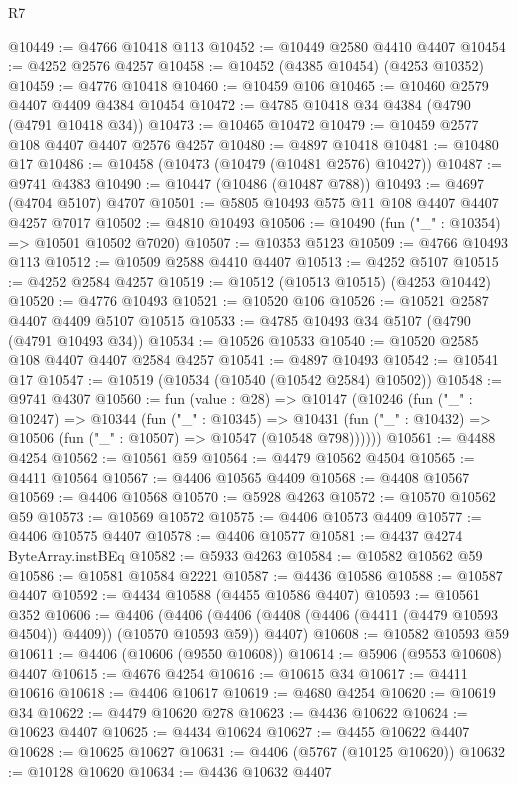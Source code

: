 \begin{lexlean}{R7}
\begin{coremodule}
@10449 := @4766 @10418 @113
@10452 := @10449 @2580 @4410 @4407
@10454 := @4252 @2576 @4257
@10458 := @10452 (@4385 @10454) (@4253 @10352)
@10459 := @4776 @10418
@10460 := @10459 @106
@10465 := @10460 @2579 @4407 @4409 @4384 @10454
@10472 := @4785 @10418 @34 @4384 (@4790 (@4791 @10418 @34))
@10473 := @10465 @10472
@10479 := @10459 @2577 @108 @4407 @4407 @2576 @4257
@10480 := @4897 @10418
@10481 := @10480 @17
@10486 := @10458 (@10473 (@10479 (@10481 @2576) @10427))
@10487 := @9741 @4383
@10490 := @10447 (@10486 (@10487 @788))
@10493 := @4697 (@4704 @5107) @4707
@10501 := @5805 @10493 @575 @11 @108 @4407 @4407 @4257 @7017
@10502 := @4810 @10493
@10506 := @10490 (fun ("_" : @10354) => @10501 @10502 @7020)
@10507 := @10353 @5123
@10509 := @4766 @10493 @113
@10512 := @10509 @2588 @4410 @4407
@10513 := @4252 @5107
@10515 := @4252 @2584 @4257
@10519 := @10512 (@10513 @10515) (@4253 @10442)
@10520 := @4776 @10493
@10521 := @10520 @106
@10526 := @10521 @2587 @4407 @4409 @5107 @10515
@10533 := @4785 @10493 @34 @5107 (@4790 (@4791 @10493 @34))
@10534 := @10526 @10533
@10540 := @10520 @2585 @108 @4407 @4407 @2584 @4257
@10541 := @4897 @10493
@10542 := @10541 @17
@10547 := @10519 (@10534 (@10540 (@10542 @2584) @10502))
@10548 := @9741 @4307
@10560 := fun (value : @28) =>
  @10147
    (@10246
      (fun ("_" : @10247) =>
      @10344
        (fun ("_" : @10345) =>
        @10431 (fun ("_" : @10432) => @10506 (fun ("_" : @10507) => @10547 (@10548 @798))))))
@10561 := @4488 @4254
@10562 := @10561 @59
@10564 := @4479 @10562 @4504
@10565 := @4411 @10564
@10567 := @4406 @10565 @4409
@10568 := @4408 @10567
@10569 := @4406 @10568
@10570 := @5928 @4263
@10572 := @10570 @10562 @59
@10573 := @10569 @10572
@10575 := @4406 @10573 @4409
@10577 := @4406 @10575 @4407
@10578 := @4406 @10577
@10581 := @4437 @4274 ByteArray.instBEq
@10582 := @5933 @4263
@10584 := @10582 @10562 @59
@10586 := @10581 @10584 @2221
@10587 := @4436 @10586
@10588 := @10587 @4407
@10592 := @4434 @10588 (@4455 @10586 @4407)
@10593 := @10561 @352
@10606 := @4406
    (@4406 (@4406 (@4408 (@4406 (@4411 (@4479 @10593 @4504)) @4409)) (@10570 @10593 @59)) @4407)
@10608 := @10582 @10593 @59
@10611 := @4406 (@10606 (@9550 @10608))
@10614 := @5906 (@9553 @10608) @4407
@10615 := @4676 @4254
@10616 := @10615 @34
@10617 := @4411 @10616
@10618 := @4406 @10617
@10619 := @4680 @4254
@10620 := @10619 @34
@10622 := @4479 @10620 @278
@10623 := @4436 @10622
@10624 := @10623 @4407
@10625 := @4434 @10624
@10627 := @4455 @10622 @4407
@10628 := @10625 @10627
@10631 := @4406 (@5767 (@10125 @10620))
@10632 := @10128 @10620
@10634 := @4436 @10632 @4407

\end{coremodule}
\end{lexlean}
